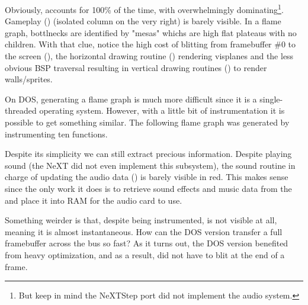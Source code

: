 \par
Obviously,  accounts for 100\% of the time, with  overwhelmingly dominating\footnote{But keep in mind the NeXTStep port did not implement the audio system.}. Gameplay () (isolated column on the very right) is barely visible. In a flame graph, bottlnecks are identified by "mesas" whichs are high flat plateaus with no children. With that clue, notice the high cost of blitting from framebuffer \#0 to the screen (), the horizontal drawing routine () rendering visplanes and the less obvious BSP traversal resulting in vertical drawing routines () to render walls/sprites.




On DOS, generating a flame graph is much more difficult since it is a single-threaded operating system. However, with a little bit of instrumentation it is possible to get something similar. The following flame graph was generated by instrumenting ten functions.\\
\par
\vspace{4mm}
\par
 Despite its simplicity we can still extract precious information. Despite playing sound (the NeXT did not even implement this subsystem), the sound routine in charge of updating the audio data () is barely visible in red. This makes sense since the only work it does is to retrieve sound effects and music data from the  and place it into RAM for the audio card to use.\\
\par
 Something weirder is that, despite being instrumented,  is not visible at all, meaning it is almost instantaneous. How can the DOS version transfer a full framebuffer across the bus so fast? As it turns out, the DOS version benefited from heavy optimization, and as a result, did not have to blit at the end of a frame.\\
\par


